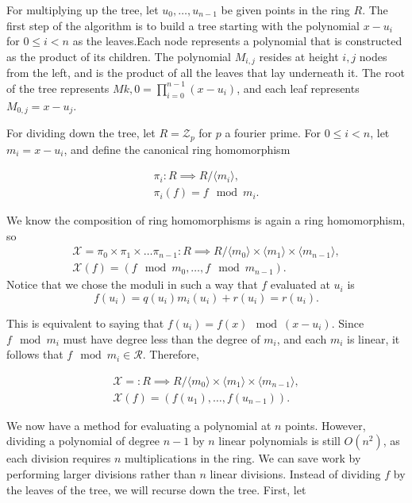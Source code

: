 \documentclass[12pt,letterpaper]{article}
\begin{document}
\begin{itemize}
            For multiplying up the tree, let $u_0,\dots,u_{n-1}$ be given points in the ring $R$. The first step of the algorithm is to build a tree starting with the polynomial $x-u_i$ for $0\leq i < n$ as the leaves.Each node represents a polynomial that is constructed as the product of its children. The polynomial $M_{i,j}$ resides at height $i, j$ nodes from the left, and is the product of all the leaves that lay underneath it. The root of the tree represents $M{k,0}=\prod_{i=0}^{n-1}(x-u_i)$, and each leaf represents $M_{0,j}=x-u_j$.

            For dividing down the tree, let $R = \mathcal{Z}_p$ for $p$ a fourier prime. For $0\leq i < n$, let $m_i=x-u_i$, and define the canonical ring homomorphism

            $$\begin{aligned}
            \pi_i:R \implies R/\langle m_i \rangle,  \\
            \pi_i(f)=f \mod m_i.
            \end{aligned}$$

            We know the composition of ring homomorphisms is again a ring homomorphism, so
            $$\begin{aligned}
            \mathcal{X}=\pi_0 \times \pi_1 \times \dots \pi_{n-1}:R \implies R/\langle m_0 \rangle \times \langle m_1 \rangle \times \langle m_{n-1} \rangle, \\
            \mathcal{X}(f) = (f \mod m_0, \dots, f \mod m_{n-1}).
            \end{aligned}$$
            Notice that we chose the moduli in such a way that $f$ evaluated at $u_i$ is
            $$
            f(u_i)=q(u_i)m_i(u_i)+r(u_i)=r(u_i).
            $$

            This is equivalent to saying that $f(u_i) = f(x) \mod (x-u_i)$. Since $f \mod m_i$ must have degree less than the degree of $m_i$, and each $m_i$ is linear, it follows that $f \mod m_i \in \mathcal{R}.$ Therefore,

            $$\begin{aligned}
            \mathcal{X}=:R \implies R/\langle m_0 \rangle \times \langle m_1 \rangle \times \langle m_{n-1} \rangle,\\
            \mathcal{X}(f) = (f(u_1), \dots, f(u_{n-1})).
            \end{aligned}$$

            We now have a method for evaluating a polynomial at $n$ points. However, dividing a polynomial of degree $n-1$ by $n$ linear polynomials is still $O(n^2)$, as each division requires $n$ multiplications in the ring. We can save work by performing larger divisions rather than $n$ linear divisions. Instead of dividing $f$ by the leaves of the tree, we will recurse down the tree. First, let
            

\end{itemize}
\end{document}
